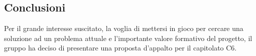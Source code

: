 \documentclass[../StudioDiFattibilita.tex]{subfiles}
\begin{document}
		\subsection{Conclusioni}
		Per il grande interesse suscitato, la voglia di mettersi in gioco per cercare una soluzione ad un problema attuale e l’importante
		valore formativo del progetto, il gruppo ha deciso di presentare una proposta d’appalto per il capitolato C6.
\end{document}
